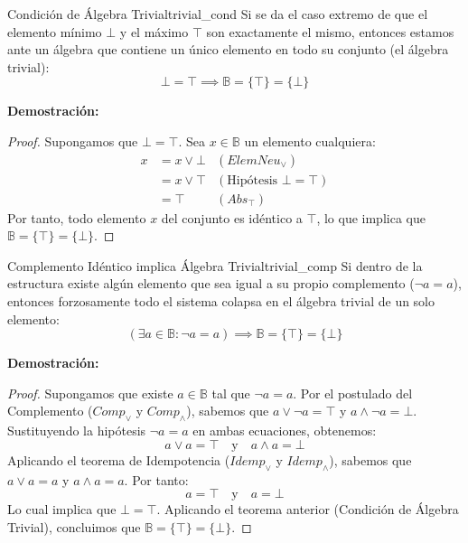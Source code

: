 \documentclass[12pt,a4paper]{article}
\newcommand{\desplegable}[2]{%
  \par\vspace{1ex}\noindent
  \textbf{Demostración:}
  \vspace{1ex}
  
  #2
  \par\vspace{1ex}
}
\begin{document}
\begin{teorema}{Condición de Álgebra Trivial}{trivial_cond}
Si se da el caso extremo de que el elemento mínimo $\bot$ y el máximo $\top$ son exactamente el mismo, entonces estamos ante un álgebra que contiene un único elemento en todo su conjunto (el álgebra trivial):
\[ \bot = \top \implies \mathbb{B} = \{\top\} = \{\bot\} \]
\end{teorema}
\desplegable{proof_trivial_cond}{
\begin{proof}
Supongamos que $\bot = \top$. Sea $x \in \mathbb{B}$ un elemento cualquiera:
\begin{align*}
    x &= x \vee \bot & (ElemNeu_\vee) \\
      &= x \vee \top & (\text{Hipótesis } \bot = \top) \\
      &= \top & (Abs_\top)
\end{align*}
Por tanto, todo elemento $x$ del conjunto es idéntico a $\top$, lo que implica que $\mathbb{B} = \{\top\} = \{\bot\}$.
\end{proof}
}

\begin{teorema}{Complemento Idéntico implica Álgebra Trivial}{trivial_comp}
Si dentro de la estructura existe algún elemento que sea igual a su propio complemento ($\neg a = a$), entonces forzosamente todo el sistema colapsa en el álgebra trivial de un solo elemento:
\[ (\exists a \in \mathbb{B} : \neg a = a) \implies \mathbb{B} = \{\top\} = \{\bot\} \]
\end{teorema}
\desplegable{proof_trivial_comp}{
\begin{proof}
Supongamos que existe $a \in \mathbb{B}$ tal que $\neg a = a$. Por el postulado del Complemento ($Comp_\vee$ y $Comp_\wedge$), sabemos que $a \vee \neg a = \top$ y $a \wedge \neg a = \bot$. Sustituyendo la hipótesis $\neg a = a$ en ambas ecuaciones, obtenemos:
$$ a \vee a = \top \quad \text{y} \quad a \wedge a = \bot $$
Aplicando el teorema de Idempotencia ($Idemp_\vee$ y $Idemp_\wedge$), sabemos que $a \vee a = a$ y $a \wedge a = a$. Por tanto:
$$ a = \top \quad \text{y} \quad a = \bot $$
Lo cual implica que $\bot = \top$. Aplicando el teorema anterior (Condición de Álgebra Trivial), concluimos que $\mathbb{B} = \{\top\} = \{\bot\}$.
\end{proof}
}
\end{document}
